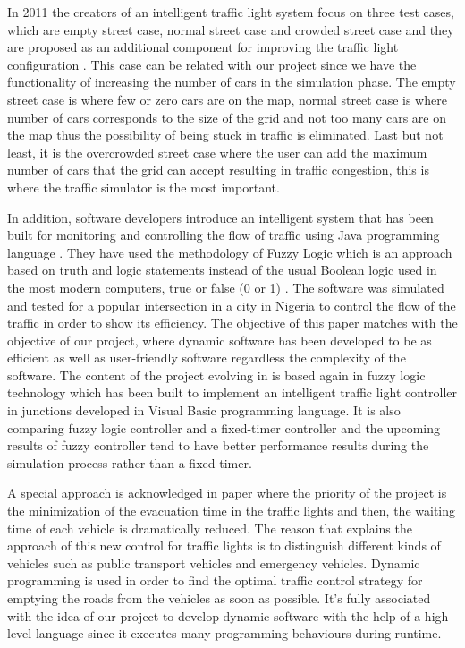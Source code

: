 \documentclass[oneside]{article}
\begin{document}
\noindent In 2011 the creators of an intelligent traffic light system focus on three test cases, which are empty street case, normal street case and crowded street case and they are proposed as an additional component for improving the traffic light configuration \cite{kareem2011intelligent}. This case can be related with our project since we have the functionality of increasing the number of cars in the simulation phase. The empty street case is where few or zero cars are on the map, normal street case is where number of cars corresponds to the size of the grid and not too many cars are on the map thus the possibility of being stuck in traffic is eliminated. Last but not least, it is the overcrowded street case where the user can add the maximum number of cars that the grid can accept resulting in traffic congestion, this is where the traffic simulator is the most important. 
\newline

\noindent In addition, software developers introduce an intelligent system that has been built for monitoring and controlling the flow of traffic using Java programming language \cite{chinyere2011design}. They have used the methodology of Fuzzy Logic which is an approach based on truth and logic statements instead of the usual Boolean logic used in the most modern computers, true or false (0 or 1) \cite{fuzzyLogic}. The software was simulated and tested for a popular intersection in a city in Nigeria to control the flow of the traffic in order to show its efficiency. The objective of this paper matches with the objective of our project, where dynamic software has been developed to be as efficient as well as user-friendly software regardless the complexity of the software. The content of the project evolving in \cite{center1996intelligent} is based again in fuzzy logic technology which has been built to implement an intelligent traffic light controller in junctions developed in Visual Basic programming language. It is also comparing fuzzy logic controller and a fixed-timer controller and the upcoming results of fuzzy controller tend to have better performance results during the simulation process rather than a fixed-timer.
\newline

\noindent A special approach is acknowledged in paper \cite{wu2007discrete} where the priority of the project is the minimization of the evacuation time in the traffic lights and then, the waiting time of each vehicle is dramatically reduced. The reason that explains the approach of this new control for traffic lights is to distinguish different kinds of vehicles such as public transport vehicles and emergency vehicles. Dynamic programming is used in order to find the optimal traffic control strategy for emptying the roads from the vehicles as soon as possible. It's fully associated with the idea of our project to develop dynamic software with the help of a high-level language since it executes many programming behaviours during runtime. 
\newpage
\end{document}
